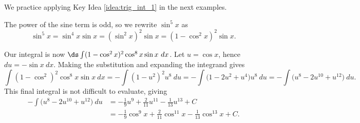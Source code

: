 We practice applying Key Idea \ref{idea:trig_int_1} in the next examples.\\

{The power of the sine term is odd, so we rewrite $\sin^5x$ as $$\sin^5x = \sin^4x\sin x = (\sin^2x)^2\sin x = (1-\cos^2x)^2\sin x.$$

Our integral is now $\ds \int (1-\cos^2x)^2\cos^8x\sin x\ dx$. Let $u = \cos x$, hence $du = -\sin x\ dx$. Making the substitution and expanding the integrand gives
$$\int (1-\cos^2)^2\cos^8x\sin x\ dx = -\int (1-u^2)^2u^8\ du = -\int \big(1-2u^2+u^4\big)u^8\ du = -\int \big(u^8-2u^{10}+u^{12}\big)\ du.$$
This final integral is not difficult to evaluate, giving 
\begin{align*} -\int \big(u^8-2u^{10}+u^{12}\big)\ du &= -\frac19u^9 + \frac2{11}u^{11} - \frac1{13}u^{13} + C \\
										&=-\frac19\cos^9 x + \frac2{11}\cos^{11} x - \frac1{13}\cos^{13} x + C.
\end{align*}
}\\

